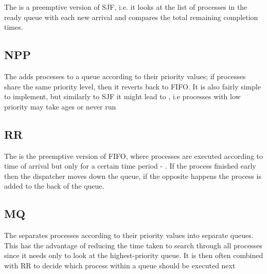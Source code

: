 		\par{The  is a preemptive version of SJF, i.e. it looks at the list of processes in the ready queue with each new arrival and compares the total remaining completion times.}

	\subsection{NPP}

		\par{The  adds processes to a queue according to their priority values; if processes share the same priority level, then it reverts back to FIFO. It is also fairly simple to implement, but similarly to SJF it might lead to , i.e processes with low priority may take ages or never run}

	\subsection{RR}

		\par{The  is the preemptive version of FIFO, where processes are executed according to time of arrival but only for a certain time period - . If the process finished early then the dispatcher moves down the queue, if the opposite happens the process is added to the back of the queue.}

	\subsection{MQ}

		\par{The  separates processes according to their priority values into separate queues. This has the advantage of reducing the time taken to search through all processes since it needs only to look at the highest-priority queue. It is then often combined with RR to decide which process within a queue should be executed next }


























